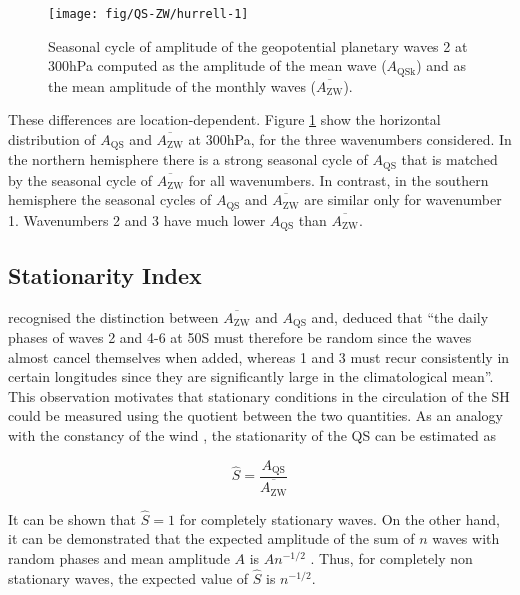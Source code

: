 \documentclass[draft,linenumbers]{agujournal2018}
\begin{document}
\begin{figure}[h]

{\centering \texttt{[image: fig/QS-ZW/hurrell-1]} 

}

\caption{Seasonal cycle of amplitude of the geopotential planetary waves 2 at 300hPa computed as the amplitude of the mean wave ($A_\mathrm{QSk}$) and as the mean amplitude of the monthly waves ($\overline{A_\mathrm{ZW} }$).}\label{fig:hurrell}
\end{figure}

These differences are location-dependent. Figure \ref{fig:hurrell} show
the horizontal distribution of \(A_\mathrm{QS}\) and
\(\overline{A_\mathrm{ZW}}\) at 300hPa, for the three wavenumbers
considered. In the northern hemisphere there is a strong seasonal cycle
of \(A_\mathrm{QS}\) that is matched by the seasonal cycle of
\(\overline{A_\mathrm{ZW}}\) for all wavenumbers. In contrast, in the
southern hemisphere the seasonal cycles of \(A_\mathrm{QS}\) and
\(\overline{A_\mathrm{ZW}}\) are similar only for wavenumber 1.
Wavenumbers 2 and 3 have much lower \(A_\mathrm{QS}\) than
\(\overline{A_\mathrm{ZW}}\).

\subsection{Stationarity Index}

\citet{Loon1972} recognised the distinction between
\(\overline{A_\mathrm{ZW}}\) and \(A_\mathrm{QS}\) and, deduced that
``the daily phases of waves 2 and 4-6 at 50\degree S must therefore be
random since the waves almost cancel themselves when added, whereas 1
and 3 must recur consistently in certain longitudes since they are
significantly large in the climatological mean''. This observation
motivates that stationary conditions in the circulation of the SH could
be measured using the quotient between the two quantities. As an analogy
with the constancy of the wind \citep{Singer1967}, the stationarity of
the QS can be estimated as

\begin{linenomath*}
\begin{equation}\label{eq:S}
\hat{S} = \frac{A_\mathrm{QS}}{\overline{A_\mathrm{ZW}}}
\end{equation}
\end{linenomath*}

It can be shown that \(\hat{S} = 1\) for completely stationary waves. On
the other hand, it can be demonstrated that the expected amplitude of
the sum of \(n\) waves with random phases and mean amplitude \(A\) is
\(An^{-1/2}\) \citep{Pain2005}. Thus, for completely non stationary
waves, the expected value of \(\hat{S}\) is \(n^{-1/2}\).
\end{document}

